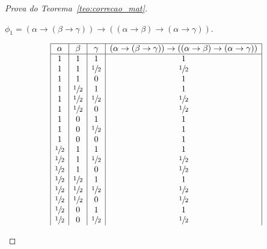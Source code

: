 \begin{proof}[Prova do Teorema~\ref{teo:correcao_mat}]
\begin{provaporcasos}
\begin{provaporsubcasos}
                \subcasodeprova{} $\phi_{1} = (\alpha \to (\beta \to \gamma)) \to ((\alpha \to \beta) \to (\alpha \to \gamma ))$.
                
                    \begin{center}
                        \[
                            \begin{array}{|c|c|c|c|}%
                                \hline
                                \alpha      & \beta & \gamma & (\alpha \to (\beta \to \gamma)) \to ((\alpha \to \beta) \to (\alpha \to \gamma)) \\
                                \hline%
                                1           & 1           & 1           & 1 \\
                                1           & 1           & \meio{} & \meio{} \\
                                1           & 1           & 0           & 1 \\
                                1           & \meio{} & 1           & 1 \\
                                1           & \meio{} & \meio{} & \meio{} \\
                                1           & \meio{} & 0           & \meio{} \\
                                1           & 0           & 1           & 1 \\
                                1           & 0           & \meio{} & 1 \\
                                1           & 0           & 0           & 1 \\
                                \meio{} & 1           & 1           & 1 \\
                                \meio{} & 1           & \meio{} & \meio{} \\
                                \meio{} & 1           & 0           & \meio{} \\
                                \meio{} & \meio{} & 1           & 1 \\
                                \meio{} & \meio{} & \meio{} & \meio{} \\
                                \meio{} & \meio{} & 0           & \meio{} \\
                                \meio{} & 0           & 1           & 1 \\
                                \meio{} & 0           & \meio{} & \meio{} \\

\end{array}\]
\end{center}
\end{provaporsubcasos}
\end{provaporcasos}
\end{proof}

